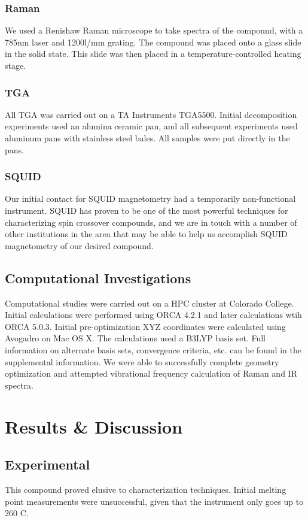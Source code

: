 \documentclass[journal=jacsat,manuscript=communication]{achemso}
\begin{document}
\subsubsection{Raman}
We used a Renishaw Raman microscope to take spectra of the compound, with a 785nm laser and 1200l/mm grating.  The compound was placed onto a glass slide in the solid state.  This slide was then placed in a temperature-controlled heating stage.
\subsubsection{TGA}
All TGA was carried out on a TA Instruments TGA5500.  Initial decomposition experiments used an alumina ceramic pan, and all subsequent experiments used aluminum pans with stainless steel bales.  All samples were put directly in the pans.  
\subsubsection{SQUID}
Our initial contact for SQUID magnetometry had a temporarily non-functional instrument.  SQUID has proven to be one of the most powerful techniques for characterizing spin crossover compounds, and we are in touch with a number of other institutions in the area that may be able to help us accomplish SQUID magnetometry of our desired compound.

\subsection{Computational Investigations}
Computational studies were carried out on a HPC cluster at Colorado College.  Initial calculations were performed using ORCA 4.2.1 and later calculations wtih ORCA 5.0.3.  Initial pre-optimization XYZ coordinates were calculated using Avogadro on Mac OS X.  The calculations used a B3LYP basis set.  Full information on alternate basis sets, convergence criteria, etc. can be found in the supplemental information.  We were able to successfully complete geometry optimization and attempted vibrational frequency calculation of Raman and IR spectra.

\section{Results \& Discussion}
\subsection{Experimental}
This compound proved elusive to characterization techniques.  Initial melting point measurements were unsuccessful, given that the instrument only goes up to 260 \degree C.  
\end{document}
